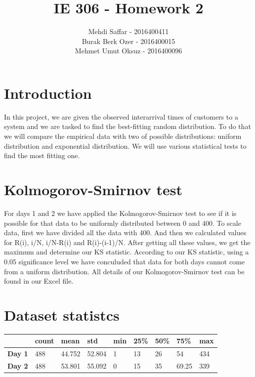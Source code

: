 \documentclass{article}
\title{IE 306 - Homework 2}
\author{Mehdi Saffar - 2016400411 \\ Burak Berk Ozer - 2016400015 \\ Mehmet Umut Oksuz - 2016400096}
\begin{document}
\maketitle

\section{Introduction}
In this project, we are given the observed interarrival times of customers to a
system and we are tasked to find the best-fitting random distribution. To do
that we will compare the empirical data with two of possible distributions:
uniform distribution and exponential distribution. We will use various
statistical tests to find the most fitting one.

\section{Kolmogorov-Smirnov test}
For days 1 and 2 we have applied the Kolmogorov-Smirnov test to see if it is possible for that data to be uniformly distributed between 0 and 400. To scale data, first we have divided all the data with 400. And then we calculated values for R(i), i/N, i/N-R(i) and  R(i)-(i-1)/N. After getting all these values, we get the maximum and determine our KS statistic. According to our KS statistic, using a 0.05 significance level we have conculuded that data for both days cannot come from a uniform distribution. All details of our Kolmogorov-Smirnov test can be found in our Excel file.
\section{Dataset statistcs}

\begin{table}[H]
    \centering
    \begin{tabular}{@{}lllllllll@{}}
        \toprule
                       & \textbf{count} & \textbf{mean} & \textbf{std} & \textbf{min} & \textbf{25\%} & \textbf{50\%} & \textbf{75\%} & \textbf{max} \\ \midrule
        \textbf{Day 1} & 488            & 44.752        & 52.804       & 1            & 13            & 26            & 54            & 434          \\
        \textbf{Day 2} & 488            & 53.801        & 55.092       & 0            & 15            & 35            & 69.25         & 339          \\ \bottomrule
    \end{tabular}
\end{table}
\end{document}
